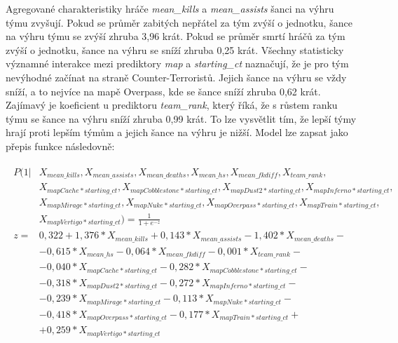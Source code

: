 Agregované charakteristiky hráče \textit{mean\_kills} a \textit{mean\_assists} šanci na výhru týmu zvyšují. Pokud se průměr zabitých nepřátel za tým zvýší o jednotku,
šance na výhru týmu se zvýší zhruba 3,96 krát. Pokud se průměr smrtí hráčů za tým zvýší o jednotku, šance na výhru se sníží zhruba 0,25 krát. Všechny statisticky
významné interakce mezi prediktory \textit{map} a \textit{starting\_ct} naznačují, že je pro tým nevýhodné začínat na straně Counter-Terroristů. Jejich šance
na výhru se vždy sníží, a to nejvíce na mapě Overpass, kde se šance sníží zhruba 0,62 krát. Zajímavý je koeficient u prediktoru \textit{team\_rank}, který říká,
že s růstem ranku týmu se šance na výhru sníží zhruba 0,99 krát. To lze vysvětlit tím, že lepší týmy hrají proti lepším týmům a jejich 
šance na výhru je nižší. Model lze zapsat jako přepis funkce následovně:

\begin{align}
    \begin{split}
        P(1 | &X_{mean\_kills}, X_{mean\_assists}, X_{mean\_deaths}, X_{mean\_hs}, X_{mean\_fkdiff}, X_{team\_rank}, \\
              &X_{mapCache*starting\_ct}, X_{mapCobblestone*starting\_ct}, X_{mapDust2*starting\_ct}, X_{mapInferno*starting\_ct}, \\
              &X_{mapMirage*starting\_ct}, X_{mapNuke*starting\_ct}, X_{mapOverpass*starting\_ct}, X_{mapTrain*starting\_ct}, \\
              &X_{mapVertigo*starting\_ct}) = \frac{1}{1 + e^{-z}} \\
        z = &0,322 + 1,376*X_{mean\_kills} + 0,143*X_{mean\_assists} - 1,402*X_{mean\_deaths} - \\
            &- 0,615*X_{mean\_hs} - 0,064*X_{mean\_fkdiff} - 0,001*X_{team\_rank} - \\
            &- 0,040*X_{mapCache*starting\_ct} - 0,282*X_{mapCobblestone*starting\_ct} - \\
            &- 0,318*X_{mapDust2*starting\_ct} - 0,272*X_{mapInferno*starting\_ct} - \\
            &- 0,239*X_{mapMirage*starting\_ct} - 0,113*X_{mapNuke*starting\_ct} - \\
            &- 0,418*X_{mapOverpass*starting\_ct} - 0,177*X_{mapTrain*starting\_ct} + \\
            &+ 0,259*X_{mapVertigo*starting\_ct}
    \end{split}
\end{align}

